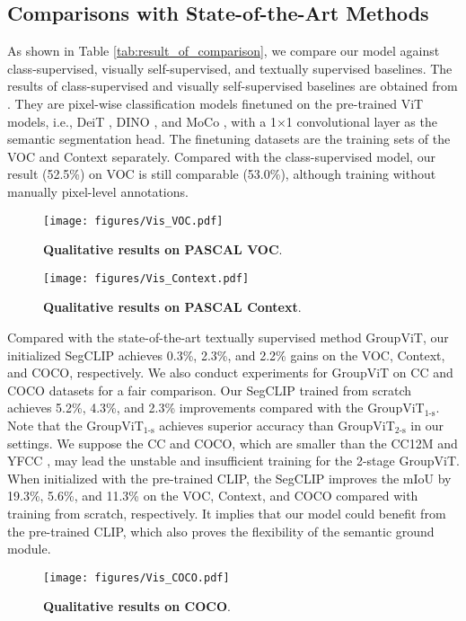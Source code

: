 \documentclass{article}
\theoremstyle{plain}
\theoremstyle{definition}
\theoremstyle{remark}
\begin{document}
\subsection{Comparisons with State-of-the-Art Methods}
As shown in Table \ref{tab:result_of_comparison}, we compare our model against class-supervised, visually self-supervised, and textually supervised baselines. The results of class-supervised and visually self-supervised baselines are obtained from \cite{Xu2022GroupViT}. They are pixel-wise classification models finetuned on the pre-trained ViT models, i.e., DeiT \cite{Touvron2021Training}, DINO \cite{Caron2021Emerging}, and MoCo \cite{Chen2021An}, with a 1$\times$1 convolutional layer as the semantic segmentation head. The finetuning datasets are the training sets of the VOC and Context separately. Compared with the class-supervised model, our result (52.5\%) on VOC is still comparable (53.0\%), although training without manually pixel-level annotations. 
\begin{figure}[tp]
    \centering
    \texttt{[image: figures/Vis\_VOC.pdf]}
    \caption{\textbf{Qualitative results on PASCAL VOC}.}
    \label{fig:qualitative_results_voc}
\end{figure}
\begin{figure}[tp]
    \centering 
    \texttt{[image: figures/Vis\_Context.pdf]}
    \caption{\textbf{Qualitative results on PASCAL Context}.}
    \label{fig:qualitative_results_context}
\end{figure}

Compared with the state-of-the-art textually supervised method GroupViT, our initialized SegCLIP achieves 0.3\%, 2.3\%, and 2.2\% gains on the VOC, Context, and COCO, respectively. We also conduct experiments for GroupViT on CC and COCO datasets for a fair comparison. Our SegCLIP trained from scratch achieves 5.2\%, 4.3\%, and 2.3\% improvements compared with the GroupViT$_{\text{1-s}}$. Note that the GroupViT$_{\text{1-s}}$ achieves superior accuracy than GroupViT$_{\text{2-s}}$ in our settings. We suppose the CC and COCO, which are smaller than the CC12M \cite{Changpinyo2021CC12M} and YFCC \cite{Thomee2016YFCC100M}, may lead the unstable and insufficient training for the 2-stage GroupViT. When initialized with the pre-trained CLIP, the SegCLIP improves the mIoU by 19.3\%, 5.6\%, and 11.3\% on the VOC, Context, and COCO compared with training from scratch, respectively. It implies that our model could benefit from the pre-trained CLIP, which also proves the flexibility of the semantic ground module.
\begin{figure}[tp]
    \centering
    \texttt{[image: figures/Vis\_COCO.pdf]}
    \caption{\textbf{Qualitative results on COCO}.}
    \label{fig:qualitative_results_coco}
\end{figure}
\end{document}
